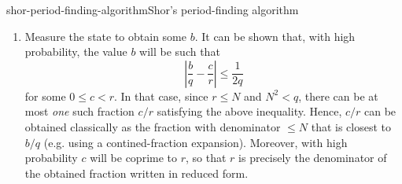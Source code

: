 \begin{topic}{shor-period-finding-algorithm}{Shor's period-finding algorithm}
\begin{enumerate}[label=(\arabic*)]
\[\begin{cases}
        \end{cases} \]
        \item Measure the state to obtain some $b$. It can be shown that, with high probability, the value $b$ will be such that
        \[ \left| \frac{b}{q} - \frac{c}{r} \right| \le \frac{1}{2 q} \]
        for some $0 \le c < r$. In that case, since $r \le N$ and $N^2 < q$, there can be at most \textit{one} such fraction $c/r$ satisfying the above inequality. Hence, $c/r$ can be obtained classically as the fraction with denominator $\le N$ that is closest to $b/q$ (e.g. using a contined-fraction expansion). Moreover, with high probability $c$ will be coprime to $r$, so that $r$ is precisely the denominator of the obtained fraction written in reduced form.
    \end{enumerate}
\end{topic}

